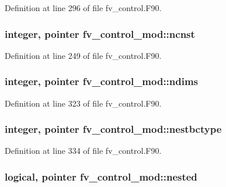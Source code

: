 Definition at line 296 of file fv\-\_\-control.\-F90.

\subsubsection[{ncnst}]{\setlength{\rightskip}{0pt plus 5cm}integer, pointer fv\-\_\-control\-\_\-mod\-::ncnst\hspace{0.3cm}{\ttfamily [private]}}\label{classfv__control__mod_aab6800a7f9ff32d719265330dbc16f1d}


Definition at line 249 of file fv\-\_\-control.\-F90.

\subsubsection[{ndims}]{\setlength{\rightskip}{0pt plus 5cm}integer, pointer fv\-\_\-control\-\_\-mod\-::ndims\hspace{0.3cm}{\ttfamily [private]}}\label{classfv__control__mod_a4a79e8e5ca77c49a271741e59dfc9723}


Definition at line 323 of file fv\-\_\-control.\-F90.

\subsubsection[{nestbctype}]{\setlength{\rightskip}{0pt plus 5cm}integer, pointer fv\-\_\-control\-\_\-mod\-::nestbctype\hspace{0.3cm}{\ttfamily [private]}}\label{classfv__control__mod_a8501bcfc790a38b595fe96fdbf094dcc}


Definition at line 334 of file fv\-\_\-control.\-F90.

\subsubsection[{nested}]{\setlength{\rightskip}{0pt plus 5cm}logical, pointer fv\-\_\-control\-\_\-mod\-::nested\hspace{0.3cm}{\ttfamily [private]}}\label{classfv__control__mod_a888c427a6af3ddf02bd3cfa499735161}


